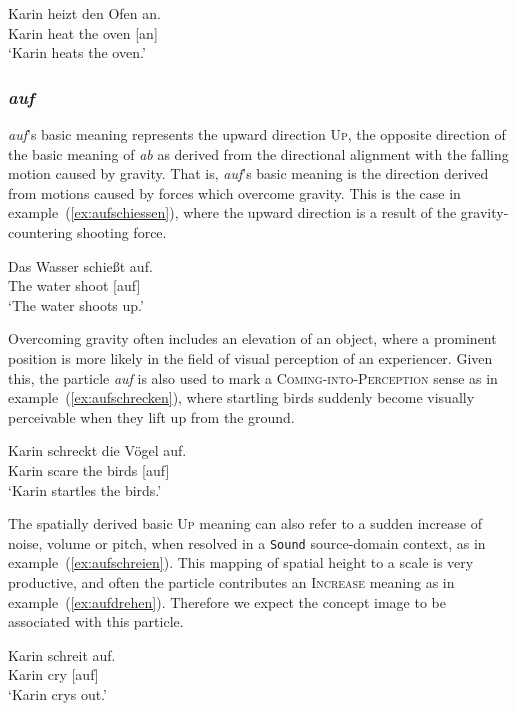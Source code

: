 \documentclass[output=paper]{langsci/langscibook}
\begin{document}
\ea\label{ex:anheizen}
\gll Karin heizt den Ofen an.\\
Karin heat the oven [an]\\
\glt `Karin heats the oven.'
\z

\vspace{+1mm}
\subsubsection{\textit{auf}}

\textit{auf}'s basic meaning represents the upward direction
\textsc{Up}, the opposite direction of the basic meaning of
\textit{ab} as derived from the directional alignment with the falling
motion caused by gravity. That is, \textit{auf}'s basic meaning is the
direction derived from motions caused by forces which overcome
gravity. This is the case in example~(\ref{ex:aufschiessen}), where
the upward direction is a result of the gravity-countering shooting
force.

\ea\label{ex:aufschiessen}
\gll Das Wasser schießt auf.\\
The water shoot [auf]\\
\glt `The water shoots up.'
\z

Overcoming gravity often includes an elevation of an object, where a
prominent position is more likely in the field of visual perception of
an experiencer. Given this, the particle \textit{auf} is also used to
mark a \textsc{Coming-into-Perception} sense as in
example~(\ref{ex:aufschrecken}), where startling birds suddenly become
visually perceivable when they lift up from the ground.

\ea\label{ex:aufschrecken}
\gll Karin schreckt die Vögel auf.\\
Karin scare the birds [auf]\\
\glt `Karin startles the birds.'
\z

The spatially derived basic \textsc{Up} meaning can also refer to a
sudden increase of noise, volume or pitch, when resolved in a
\texttt{Sound} source-domain context, as in
example~(\ref{ex:aufschreien}). This mapping of spatial height to a
scale is very productive, and often the particle contributes an
\textsc{Increase} meaning as in
example~(\ref{ex:aufdrehen}). Therefore we expect the concept image
 to be associated with this particle.

\ea\label{ex:aufschreien}
\gll Karin schreit auf.\\
Karin cry [auf]\\
\glt `Karin crys out.'
\z
\end{document}
